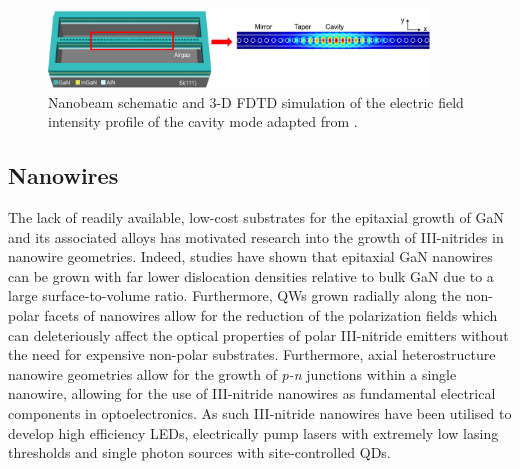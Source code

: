 \begin{figure}[h]
	\centering
	\includegraphics[width=0.9\textwidth]{Figs/Ch1/nb1.png}
	\caption {Nanobeam schematic and 3-D FDTD simulation of the electric field intensity profile of the cavity mode adapted from \cite{Trivino2015}. }
	\label{1.16}
\end{figure}
\FloatBarrier 

\subsection{Nanowires}
The lack of readily available, low-cost substrates for the epitaxial growth of GaN and its associated alloys has motivated research into the growth of III-nitrides in nanowire geometries. Indeed, studies have shown that epitaxial GaN nanowires can be grown with far lower dislocation densities relative to bulk GaN due to a large surface-to-volume ratio. Furthermore, QWs grown radially along the non-polar facets of nanowires allow for the reduction of the polarization fields which can deleteriously affect the optical properties of polar III-nitride emitters without the need for expensive non-polar substrates. Furthermore, axial heterostructure nanowire geometries allow for the growth of {\it p-n} junctions within a single nanowire, allowing for the use of III-nitride nanowires as fundamental electrical components in optoelectronics. As such III-nitride nanowires have been utilised to develop high efficiency LEDs, electrically pump lasers with extremely low lasing thresholds and single photon sources with site-controlled QDs.

